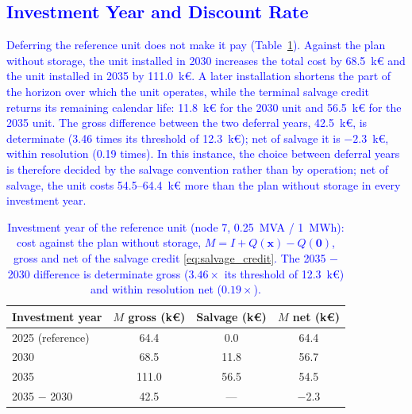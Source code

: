 \documentclass[preprint,12pt]{elsarticle}
\begin{document}
\subsection{\textcolor{blue}{Investment Year and Discount Rate}}
\label{subsec:res_sensitivities}

\textcolor{blue}{
    Deferring the reference unit does not make it pay (Table~\ref{tab:res_year_ladder}). Against the plan without storage, the unit installed in 2030 increases the total cost by 68.5~k\euro{} and the unit installed in 2035 by 111.0~k\euro{}. A later installation shortens the part of the horizon over which the unit operates, while the terminal salvage credit returns its remaining calendar life: 11.8~k\euro{} for the 2030 unit and 56.5~k\euro{} for the 2035 unit. The gross difference between the two deferral years, 42.5~k\euro{}, is determinate (3.46 times its threshold of 12.3~k\euro{}); net of salvage it is $-2.3$~k\euro{}, within resolution (0.19 times). In this instance, the choice between deferral years is therefore decided by the salvage convention rather than by operation; net of salvage, the unit costs 54.5--64.4~k\euro{} more than the plan without storage in every investment year.
}

\begin{table}[htbp!]
    \centering
    \caption{\textcolor{blue}{Investment year of the reference unit (node 7, 0.25~MVA / 1~MWh): cost against the plan without storage, $M = I + Q(\boldsymbol{x}) - Q(\boldsymbol{0})$, gross and net of the salvage credit \eqref{eq:salvage_credit}. The 2035 $-$ 2030 difference is determinate gross ($3.46\times$ its threshold of 12.3~k\euro) and within resolution net ($0.19\times$).}}
    \label{tab:res_year_ladder}
    \scriptsize\setlength{\tabcolsep}{5pt}
    \begin{tabular}{l c c c}
        \toprule
        Investment year & $M$ gross (k\euro) & Salvage (k\euro) & $M$ net (k\euro) \\
        \midrule
        2025 (reference) & 64.4  & 0.0  & 64.4 \\
        2030             & 68.5  & 11.8 & 56.7 \\
        2035             & 111.0 & 56.5 & 54.5 \\
        2035 $-$ 2030    & 42.5  & ---  & $-$2.3 \\
        \bottomrule
    \end{tabular}
\end{table}
\end{document}
